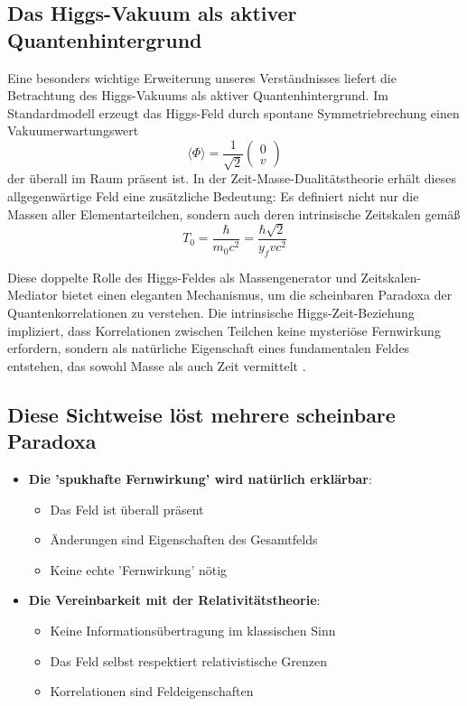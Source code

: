 \documentclass[a4paper,12pt]{article}
\begin{document}
	\subsection{Das Higgs-Vakuum als aktiver Quantenhintergrund}
	Eine besonders wichtige Erweiterung unseres Verständnisses liefert die Betrachtung des Higgs-Vakuums als aktiver Quantenhintergrund. Im Standardmodell erzeugt das Higgs-Feld durch spontane Symmetriebrechung einen Vakuumerwartungswert
	\begin{equation}
		\langle \Phi \rangle = \frac{1}{\sqrt{2}} \begin{pmatrix} 0 \\ v \end{pmatrix}
	\end{equation}
	der überall im Raum präsent ist. In der Zeit-Masse-Dualitätstheorie erhält dieses allgegenwärtige Feld eine zusätzliche Bedeutung: Es definiert nicht nur die Massen aller Elementarteilchen, sondern auch deren intrinsische Zeitskalen gemäß
	\begin{equation}
		T_0 = \frac{\hbar}{m_0 c^2} = \frac{\hbar \sqrt{2}}{y_f v c^2}
	\end{equation}
	
	Diese doppelte Rolle des Higgs-Feldes als Massengenerator und Zeitskalen-Mediator bietet einen eleganten Mechanismus, um die scheinbaren Paradoxa der Quantenkorrelationen zu verstehen. Die intrinsische Higgs-Zeit-Beziehung impliziert, dass Korrelationen zwischen Teilchen keine mysteriöse Fernwirkung erfordern, sondern als natürliche Eigenschaft eines fundamentalen Feldes entstehen, das sowohl Masse als auch Zeit vermittelt \cite{Pascher2024}.
	
	\subsection{Diese Sichtweise löst mehrere scheinbare Paradoxa}
	\begin{itemize}
		\item \textbf{Die 'spukhafte Fernwirkung' wird natürlich erklärbar}:
		\begin{itemize}
			\item Das Feld ist überall präsent
			\item Änderungen sind Eigenschaften des Gesamtfelds
			\item Keine echte 'Fernwirkung' nötig
		\end{itemize}
		\item \textbf{Die Vereinbarkeit mit der Relativitätstheorie}:
		\begin{itemize}
			\item Keine Informationsübertragung im klassischen Sinn
			\item Das Feld selbst respektiert relativistische Grenzen
			\item Korrelationen sind Feldeigenschaften
		\end{itemize}
	\end{itemize}
	
\end{document}
